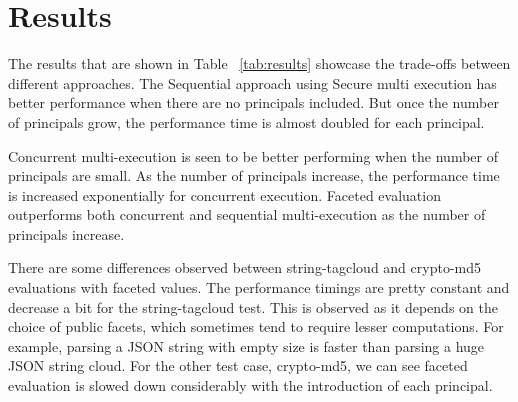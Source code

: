 \section{Results}
The results that are shown in Table ~\ref{tab:results} showcase the trade-offs between different approaches. The Sequential approach using Secure multi execution has better performance when there are no principals included. But once the number of principals grow, the performance time is almost doubled for each principal.

Concurrent multi-execution is seen to be better performing when the number of principals are small. As the number of principals increase, the performance time is increased exponentially for concurrent execution. Faceted evaluation outperforms both concurrent and sequential multi-execution as the number of principals increase. 

There are some differences observed between string-tagcloud and crypto-md5 evaluations with faceted values. The performance timings are pretty constant and decrease a bit for the string-tagcloud test. This is observed as it depends on the choice of public facets, which sometimes tend to require lesser computations. For example, parsing a JSON string with empty size is faster than parsing a huge JSON string cloud. For the other test case, crypto-md5, we can see faceted evaluation is slowed down considerably with the introduction of each principal.